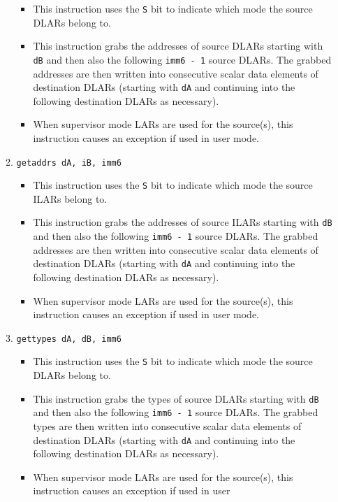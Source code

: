 \documentclass{article}
\begin{document}
\begin{itemize}
\begin{enumerate}
\begin{itemize}
				\item This instruction uses the \texttt{S} bit to indicate
					which mode the source DLARs belong to.
				\item This instruction grabs the addresses of source DLARs
					starting with \texttt{dB} and then also the following
					\texttt{imm6 - 1} source DLARs. The grabbed addresses
					are then written into consecutive scalar data elements
					of destination DLARs (starting with \texttt{dA} and
					continuing into the following destination DLARs as
					necessary).
				\item When supervisor mode LARs are used for the source(s),
					this instruction causes an exception if used in user
					mode.
				\end{itemize}
			\item \texttt{getaddrs dA, iB, imm6}
				\begin{itemize}
				\item This instruction uses the \texttt{S} bit to indicate
					which mode the source ILARs belong to.
				\item This instruction grabs the addresses of source ILARs
					starting with \texttt{dB} and then also the following
					\texttt{imm6 - 1} source DLARs. The grabbed addresses
					are then written into consecutive scalar data elements
					of destination DLARs (starting with \texttt{dA} and
					continuing into the following destination DLARs as
					necessary).
				\item When supervisor mode LARs are used for the source(s),
					this instruction causes an exception if used in user
					mode.
				\end{itemize}
			\item \texttt{gettypes dA, dB, imm6}
				\begin{itemize}
				\item This instruction uses the \texttt{S} bit to indicate
					which mode the source DLARs belong to.
				\item This instruction grabs the types of source DLARs
					starting with \texttt{dB} and then also the following
					\texttt{imm6 - 1} source DLARs. The grabbed types are
					then written into consecutive scalar data elements of
					destination DLARs (starting with \texttt{dA} and
					continuing into the following destination DLARs as
					necessary).
				\item When supervisor mode LARs are used for the source(s),
					this instruction causes an exception if used in user

\end{itemize}
\end{enumerate}
\end{itemize}
\end{document}
